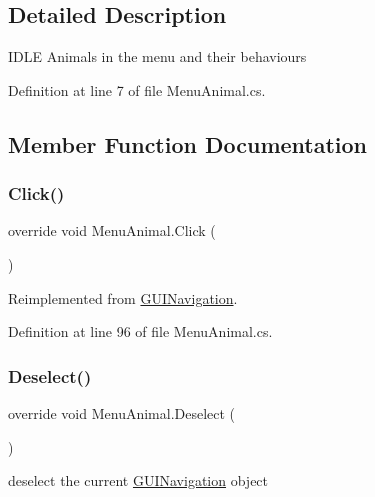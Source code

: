 \subsection{Detailed Description}
I\+D\+LE Animals in the menu and their behaviours 



Definition at line 7 of file Menu\+Animal.\+cs.



\subsection{Member Function Documentation}
\mbox{\label{class_menu_animal_abb7cd3e0be5e041e4d5df6b44c94b7e4}} 
\subsubsection{\texorpdfstring{Click()}{Click()}}
{\footnotesize\ttfamily override void Menu\+Animal.\+Click (\begin{DoxyParamCaption}{ }\end{DoxyParamCaption})\hspace{0.3cm}{\ttfamily [virtual]}}



Reimplemented from \mbox{\hyperlink{class_g_u_i_navigation_a175178a8bf2832e74c13f83bf8e8f714}{G\+U\+I\+Navigation}}.



Definition at line 96 of file Menu\+Animal.\+cs.

\mbox{\label{class_menu_animal_af9e4ef2370ac2f5e83444e62dacfda0e}} 
\subsubsection{\texorpdfstring{Deselect()}{Deselect()}}
{\footnotesize\ttfamily override void Menu\+Animal.\+Deselect (\begin{DoxyParamCaption}{ }\end{DoxyParamCaption})\hspace{0.3cm}{\ttfamily [virtual]}}



deselect the current \mbox{\hyperlink{class_g_u_i_navigation}{G\+U\+I\+Navigation}} object 



